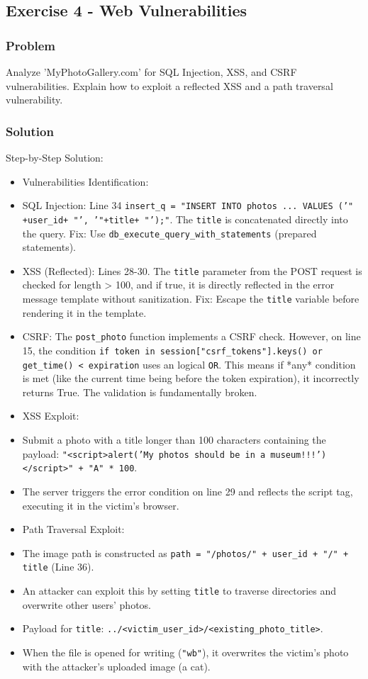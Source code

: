 \documentclass{article}
\begin{document}
\subsection{Exercise 4 - Web Vulnerabilities}
\subsubsection*{Problem}
Analyze 'MyPhotoGallery.com' for SQL Injection, XSS, and CSRF vulnerabilities. Explain how to exploit a reflected XSS and a path traversal vulnerability.

\subsubsection*{Solution}
Step-by-Step Solution:

\begin{itemize}
    \item[\textbf{1.}] Vulnerabilities Identification:
    \item SQL Injection: Line 34 \texttt{insert\_q = "INSERT INTO photos ... VALUES ('" +user\_id+ "', '"+title+ "');"}. The \texttt{title} is concatenated directly into the query. Fix: Use \texttt{db\_execute\_query\_with\_statements} (prepared statements).
    \item XSS (Reflected): Lines 28-30. The \texttt{title} parameter from the POST request is checked for length > 100, and if true, it is directly reflected in the error message template without sanitization. Fix: Escape the \texttt{title} variable before rendering it in the template.
    \item CSRF: The \texttt{post\_photo} function implements a CSRF check. However, on line 15, the condition \texttt{if token in session["csrf\_tokens"].keys() or get\_time() < expiration} uses an logical \texttt{OR}. This means if *any* condition is met (like the current time being before the token expiration), it incorrectly returns True. The validation is fundamentally broken.

    \item[\textbf{2.}] XSS Exploit:
    \item Submit a photo with a title longer than 100 characters containing the payload: \texttt{"<script>alert('My photos should be in a museum!!!')</script>" + "A" * 100}.
    \item The server triggers the error condition on line 29 and reflects the script tag, executing it in the victim's browser.

    \item[\textbf{3.}] Path Traversal Exploit:
    \item The image path is constructed as \texttt{path = "/photos/" + user\_id + "/" + title} (Line 36).
    \item An attacker can exploit this by setting \texttt{title} to traverse directories and overwrite other users' photos.
    \item Payload for \texttt{title}: \texttt{../<victim\_user\_id>/<existing\_photo\_title>}.
    \item When the file is opened for writing (\texttt{"wb"}), it overwrites the victim's photo with the attacker's uploaded image (a cat).
\end{itemize}
\end{document}
